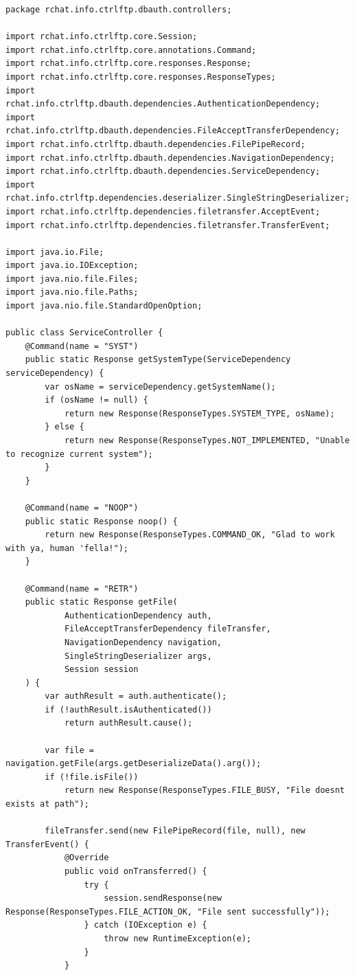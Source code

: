\documentclass[a4paper,14pt]{extarticle}
\begin{document}
\begin{verbatim}
package rchat.info.ctrlftp.dbauth.controllers;

import rchat.info.ctrlftp.core.Session;
import rchat.info.ctrlftp.core.annotations.Command;
import rchat.info.ctrlftp.core.responses.Response;
import rchat.info.ctrlftp.core.responses.ResponseTypes;
import rchat.info.ctrlftp.dbauth.dependencies.AuthenticationDependency;
import rchat.info.ctrlftp.dbauth.dependencies.FileAcceptTransferDependency;
import rchat.info.ctrlftp.dbauth.dependencies.FilePipeRecord;
import rchat.info.ctrlftp.dbauth.dependencies.NavigationDependency;
import rchat.info.ctrlftp.dbauth.dependencies.ServiceDependency;
import rchat.info.ctrlftp.dependencies.deserializer.SingleStringDeserializer;
import rchat.info.ctrlftp.dependencies.filetransfer.AcceptEvent;
import rchat.info.ctrlftp.dependencies.filetransfer.TransferEvent;

import java.io.File;
import java.io.IOException;
import java.nio.file.Files;
import java.nio.file.Paths;
import java.nio.file.StandardOpenOption;

public class ServiceController {
    @Command(name = "SYST")
    public static Response getSystemType(ServiceDependency serviceDependency) {
        var osName = serviceDependency.getSystemName();
        if (osName != null) {
            return new Response(ResponseTypes.SYSTEM_TYPE, osName);
        } else {
            return new Response(ResponseTypes.NOT_IMPLEMENTED, "Unable to recognize current system");
        }
    }

    @Command(name = "NOOP")
    public static Response noop() {
        return new Response(ResponseTypes.COMMAND_OK, "Glad to work with ya, human 'fella!");
    }

    @Command(name = "RETR")
    public static Response getFile(
            AuthenticationDependency auth,
            FileAcceptTransferDependency fileTransfer,
            NavigationDependency navigation,
            SingleStringDeserializer args,
            Session session
    ) {
        var authResult = auth.authenticate();
        if (!authResult.isAuthenticated())
            return authResult.cause();

        var file = navigation.getFile(args.getDeserializeData().arg());
        if (!file.isFile())
            return new Response(ResponseTypes.FILE_BUSY, "File doesnt exists at path");

        fileTransfer.send(new FilePipeRecord(file, null), new TransferEvent() {
            @Override
            public void onTransferred() {
                try {
                    session.sendResponse(new Response(ResponseTypes.FILE_ACTION_OK, "File sent successfully"));
                } catch (IOException e) {
                    throw new RuntimeException(e);
                }
            }


\end{verbatim}
\end{document}

